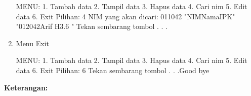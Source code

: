 \begin{enumerate}
\begin{lcverbatim}
MENU:
1. Tambah data
2. Tampil data
3. Hapus data
4. Cari nim
5. Edit data
6. Exit
Pilihan: 4
NIM yang akan dicari: 011042
"NIMNamaIPK" 
"012042Arif H3.6 "
Tekan sembarang tombol . . .
\end{lcverbatim}
\item
Menu Exit

\begin{lcverbatim}
MENU:
1. Tambah data
2. Tampil data
3. Hapus data
4. Cari nim
5. Edit data
6. Exit
Pilihan: 6
Tekan sembarang tombol . . .Good bye
\end{lcverbatim}

\end{enumerate}

\textbf{Keterangan:}

\begin{itemize}


\end{itemize}
